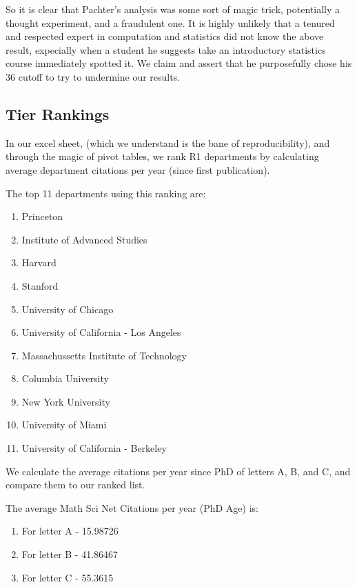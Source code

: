 \documentclass[]{article}
\begin{document}
So it is clear that Pachter's analysis was some sort of magic trick,
potentially a thought experiment, and a fraudulent one. It is highly
unlikely that a tenured and respected expert in computation and
statistics did not know the above result, expecially when a student he
suggests take an introductory statistics course immediately spotted it.
We claim and assert that he purposefully chose his 36 cutoff to try to
undermine our results.

\hypertarget{tier-rankings}{%
\subsection{Tier Rankings}\label{tier-rankings}}

In our excel sheet, (which we understand is the bane of
reproducibility), and through the magic of pivot tables, we rank R1
departments by calculating average department citations per year (since
first publication).

The top 11 departments using this ranking are:

\begin{enumerate}
\def\labelenumi{\arabic{enumi}.}
\item
  Princeton
\item
  Institute of Advanced Studies
\item
  Harvard
\item
  Stanford
\item
  University of Chicago
\item
  University of California - Los Angeles
\item
  Massachussetts Institute of Technology
\item
  Columbia University
\item
  New York University
\item
  University of Miami
\item
  University of California - Berkeley
\end{enumerate}

We calculate the average citations per year since PhD of letters A, B,
and C, and compare them to our ranked list.

The average Math Sci Net Citations per year (PhD Age) is:

\begin{enumerate}
\def\labelenumi{\arabic{enumi}.}
\item
  For letter A - 15.98726
\item
  For letter B - 41.86467
\item
  For letter C - 55.3615
\end{enumerate}
\end{document}
